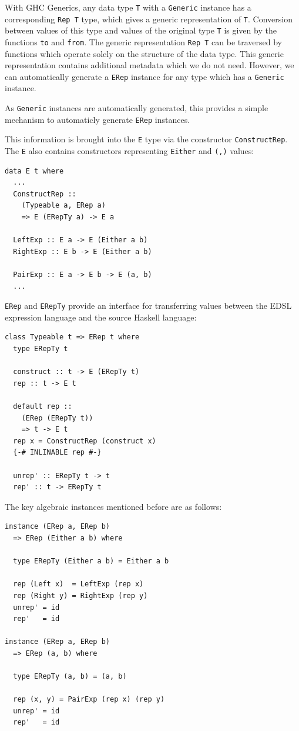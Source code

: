\documentclass[sigplan,anonymous,review]{acmart}
\newcommand{\ttt}{\texttt}
\begin{document}
With GHC Generics, any data type \ttt{T} with a \ttt{Generic} instance has a
corresponding \ttt{Rep T} type, which gives a generic representation of \ttt{T}.
Conversion between values of this type and values of the original type \ttt{T} is
given by the functions \ttt{to} and \ttt{from}. The generic representation \ttt{Rep T}
can be traversed by functions which operate solely on the structure of the data type.
This generic representation contains additional metadata which we do not need.
However, we can automatically generate a \ttt{ERep} instance for any type which
has a \ttt{Generic} instance.

As \ttt{Generic} instances are automatically generated, this provides a simple mechanism
to automaticly generate \ttt{ERep} instances.


This information is brought into the \ttt{E} type via the constructor
\ttt{ConstructRep}. The \ttt{E} also contains constructors representing \ttt{Either}
and \ttt{(,)} values:

\begin{lstlisting}
data E t where
  ...
  ConstructRep ::
    (Typeable a, ERep a)
    => E (ERepTy a) -> E a

  LeftExp :: E a -> E (Either a b)
  RightExp :: E b -> E (Either a b)

  PairExp :: E a -> E b -> E (a, b)
  ...
\end{lstlisting}

\ttt{ERep} and \ttt{ERepTy} provide an interface for transferring values between the EDSL
expression language and the source Haskell language:

\begin{lstlisting}
class Typeable t => ERep t where
  type ERepTy t

  construct :: t -> E (ERepTy t)
  rep :: t -> E t

  default rep ::
    (ERep (ERepTy t))
    => t -> E t
  rep x = ConstructRep (construct x)
  {-# INLINABLE rep #-}

  unrep' :: ERepTy t -> t
  rep' :: t -> ERepTy t
\end{lstlisting}

The key algebraic instances mentioned before are as follows:

\begin{lstlisting}
instance (ERep a, ERep b)
  => ERep (Either a b) where

  type ERepTy (Either a b) = Either a b

  rep (Left x)  = LeftExp (rep x)
  rep (Right y) = RightExp (rep y)
  unrep' = id
  rep'   = id

instance (ERep a, ERep b)
  => ERep (a, b) where

  type ERepTy (a, b) = (a, b)

  rep (x, y) = PairExp (rep x) (rep y)
  unrep' = id
  rep'   = id
\end{lstlisting}
\end{document}
